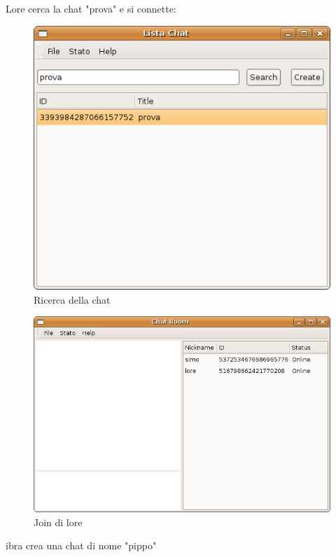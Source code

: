 Lore cerca la chat "prova" e si connette:
\begin{figure}[H]
\begin{center}
\includegraphics[scale=0.5]{etc/ricerca_lore.png}
\caption{Ricerca della chat}
\label{ricercalore}
\end{center}
\end{figure}
\begin{figure}[H]
\begin{center}
\includegraphics[scale=0.5]{etc/join_lore.png}
\caption{Join di lore}
\label{joinlore}
\end{center}
\end{figure}
ibra crea una chat di nome "pippo"

